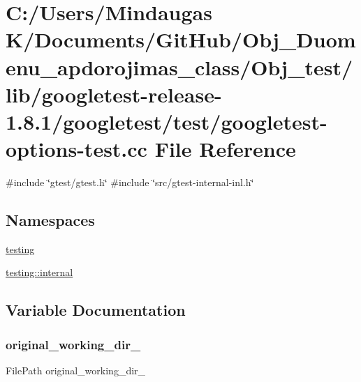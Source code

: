 \hypertarget{_obj__test_2lib_2googletest-release-1_88_81_2googletest_2test_2googletest-options-test_8cc}{}\section{C\+:/\+Users/\+Mindaugas K/\+Documents/\+Git\+Hub/\+Obj\+\_\+\+Duomenu\+\_\+apdorojimas\+\_\+class/\+Obj\+\_\+test/lib/googletest-\/release-\/1.8.1/googletest/test/googletest-\/options-\/test.cc File Reference}
\label{_obj__test_2lib_2googletest-release-1_88_81_2googletest_2test_2googletest-options-test_8cc}
{\ttfamily \#include \char`\"{}gtest/gtest.\+h\char`\"{}}\newline
{\ttfamily \#include \char`\"{}src/gtest-\/internal-\/inl.\+h\char`\"{}}\newline
\subsection*{Namespaces}
\begin{DoxyCompactItemize}
\item 
 \mbox{\hyperlink{namespacetesting}{testing}}
\item 
 \mbox{\hyperlink{namespacetesting_1_1internal}{testing\+::internal}}
\end{DoxyCompactItemize}


\subsection{Variable Documentation}
\mbox{\label{_obj__test_2lib_2googletest-release-1_88_81_2googletest_2test_2googletest-options-test_8cc_aa5f13fd18a275d0a3117700f30bfb9ff}} 
\subsubsection{\texorpdfstring{original\_working\_dir\_}{original\_working\_dir\_}}
{\footnotesize\ttfamily File\+Path original\+\_\+working\+\_\+dir\+\_\+\hspace{0.3cm}{\ttfamily [protected]}}

